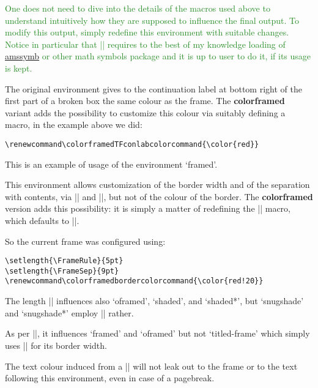 \documentclass[a4paper,dvipdfmx,11pt]{article}
\def\colorframedTFconlabcolorcommand{\color{red}}
\def\colorframedbordercolorcommand{\color{red!20}}
\def\ctanpackage#1{\href{https://ctan.org/pkg/#1}{#1}}
\newcommand\colorframed{%
        \texorpdfstring{{\color{joli}\bfseries colorframed}}{colorframed}\xspace}
\begin{document}
\begin{snugshade*}\textcolor{ForestGreen}{%
  One does not need to dive into the details of the macros
  used above to understand intuitively how they are supposed
  to influence the final output.  To modify this output,
  simply redefine this environment with suitable changes.
  Notice in particular that \expandafter|\string\blacktriangleright| requires to
  the best of my knowledge loading of \ctanpackage{amssymb} or
  other math symbols package and it is up to user to do it, if
  its usage is kept.}

The original environment gives to the continuation label at
bottom right of the first part of a broken box the same colour
as the frame.  The \colorframed variant adds the possibility
to customize this colour via suitably defining a macro, in the
example above we did:
\begin{verbatim}
\renewcommand\colorframedTFconlabcolorcommand{\color{red}}
\end{verbatim}
\end{snugshade*}

\begin{framed}
  This is an example of usage of the environment `framed'.

  This environment allows customization of the border width
  and of the separation with contents, via |\FrameRule| and
  |\FrameSep|, but not of the colour of the border.  The
  \colorframed version adds this possibility: it is simply a
  matter of redefining the |\colorframedbordercolorcommand|
  macro, which defaults to |\normalcolor|.

\color{blue}
  So the current frame was configured using:
\begin{verbatim}
\setlength{\FrameRule}{5pt}
\setlength{\FrameSep}{9pt}
\renewcommand\colorframedbordercolorcommand{\color{red!20}}
\end{verbatim}
\begin{footnotesize}\normalcolor
  The length |\FrameSep| influences also `oframed', `shaded', and `shaded*',
  but `snugshade' and `snugshade*' employ |\fboxsep| rather.

  As per |\FrameRule|, it influences `framed' and `oframed' but not
  `titled-frame' which simply uses |\fboxrule| for its border width.\par
\end{footnotesize}
  The text colour induced from a |\color{blue}|
  will not leak out to the frame or to the text following this
  environment, even in case of a pagebreak.
\end{framed}
\end{document}
